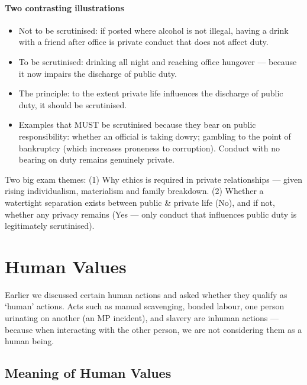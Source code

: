 \paragraph{Two contrasting illustrations}
\begin{itemize}
\item Not to be scrutinised: if posted where alcohol is not illegal, having a drink with a friend after office is private conduct that does not affect duty.
\item To be scrutinised: drinking all night and reaching office hungover --- because it now impairs the discharge of public duty.
\end{itemize}

\begin{CriticalPoint}
\begin{itemize}
\item The principle: to the extent private life influences the discharge of public duty, it should be scrutinised.
\item Examples that MUST be scrutinised because they bear on public responsibility: whether an official is taking dowry; gambling to the point of bankruptcy (which increases proneness to corruption). Conduct with no bearing on duty remains genuinely private.
\end{itemize}
\end{CriticalPoint}

\begin{QuickRevision}
Two big exam themes: (1) Why ethics is required in private relationships --- given rising individualism, materialism and family breakdown. (2) Whether a watertight separation exists between public \& private life (No), and if not, whether any privacy remains (Yes --- only conduct that influences public duty is legitimately scrutinised).
\end{QuickRevision}

\section{Human Values}

Earlier we discussed certain human actions and asked whether they qualify as `human' actions. Acts such as manual scavenging, bonded labour, one person urinating on another (an MP incident), and slavery are inhuman actions --- because when interacting with the other person, we are not considering them as a human being.

\subsection{Meaning of Human Values}

